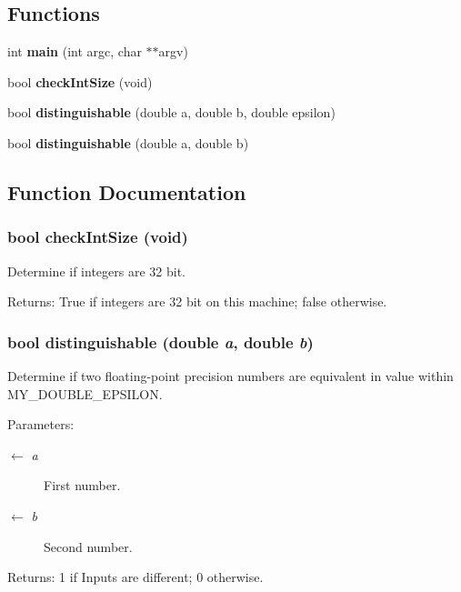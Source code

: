\subsection*{Functions}
\begin{CompactItemize}
\item 
int {\bf main} (int argc, char $\ast$$\ast$argv)
\item 
bool {\bf check\-Int\-Size} (void)
\item 
bool {\bf distinguishable} (double a, double b, double epsilon)
\item 
bool {\bf distinguishable} (double a, double b)
\end{CompactItemize}


\subsection{Function Documentation}
\subsubsection{\setlength{\rightskip}{0pt plus 5cm}bool check\-Int\-Size (void)}\label{meshmorph_8cc_1122d758f1b6eac91f763e9b10d306d2}


Determine if integers are 32 bit. \begin{Desc}
\item[Returns:]True if integers are 32 bit on this machine; false otherwise. \end{Desc}
\subsubsection{\setlength{\rightskip}{0pt plus 5cm}bool distinguishable (double {\em a}, double {\em b})}\label{meshmorph_8cc_7e48ad73971e78bc20e3deb1e74546ad}


Determine if two floating-point precision numbers are equivalent in value within MY\_\-DOUBLE\_\-EPSILON. \begin{Desc}
\item[Parameters:]
\begin{description}
\item[\mbox{$\leftarrow$} {\em a}]First number. \item[\mbox{$\leftarrow$} {\em b}]Second number. \end{description}
\end{Desc}
\begin{Desc}
\item[Returns:]1 if Inputs are different; 0 otherwise. \end{Desc}
